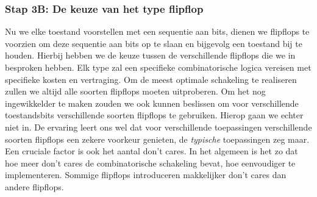 \begin{table}[hbt]
\centering
{}
\caption{Codering van de Moore-machine van het leidend voorbeeld.}
\end{table}

\subsubsection{Stap 3B: De keuze van het type flipflop}
Nu we elke toestand voorstellen met een sequentie aan bits, dienen we flipflops te voorzien om deze sequentie aan bits op te slaan en bijgevolg een toestand bij te houden. Hierbij hebben we de keuze tussen de verschillende flipflops die we in  besproken hebben. Elk type zal een specifieke combinatorische logica vereisen met specifieke kosten en vertraging. Om de meest optimale schakeling te realiseren zullen we altijd alle soorten flipflops moeten uitproberen. Om het nog ingewikkelder te maken zouden we ook kunnen beslissen om voor verschillende toestandsbits verschillende soorten flipflops te gebruiken. Hierop gaan we echter niet in. De ervaring leert ons wel dat voor verschillende toepassingen verschillende soorten flipflops een zekere voorkeur genieten, de \emph{typische} toepassingen zeg maar. Een cruciale factor is ook het aantal don't cares. In het algemeen is het zo dat hoe meer don't cares de combinatorische schakeling bevat, hoe eenvoudiger te implementeren. Sommige flipflops introduceren makkelijker don't cares dan andere flipflops.

